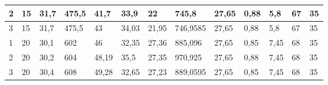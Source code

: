 \begin{table}[H]
{\begin{tabular}{|l|llll|lll|ll|l|ll|}
2             & \multicolumn{1}{l|}{\cellcolor[HTML]{C6E0B4}15}               & \multicolumn{1}{l|}{\cellcolor[HTML]{C6E0B4}31,7}             & \multicolumn{1}{l|}{\cellcolor[HTML]{C6E0B4}475,5}            & 41,7              & \multicolumn{1}{l|}{\cellcolor[HTML]{C6E0B4}33,9}              & \multicolumn{1}{l|}{\cellcolor[HTML]{C6E0B4}22}                & 745,8             & \multicolumn{1}{l|}{\cellcolor[HTML]{C6E0B4}27,65}            & 0,88             & 5,8                       & \multicolumn{1}{l|}{\cellcolor[HTML]{C6E0B4}67}                  & 35               \\ \hline
\rowcolor[HTML]{E2EFDA} 
3             & \multicolumn{1}{l|}{\cellcolor[HTML]{E2EFDA}15}               & \multicolumn{1}{l|}{\cellcolor[HTML]{E2EFDA}31,7}             & \multicolumn{1}{l|}{\cellcolor[HTML]{E2EFDA}475,5}            & 43                & \multicolumn{1}{l|}{\cellcolor[HTML]{E2EFDA}34,03}             & \multicolumn{1}{l|}{\cellcolor[HTML]{E2EFDA}21,95}             & 746,9585          & \multicolumn{1}{l|}{\cellcolor[HTML]{E2EFDA}27,65}            & 0,88             & 5,8                       & \multicolumn{1}{l|}{\cellcolor[HTML]{E2EFDA}67}                  & 35               \\ \hline
\rowcolor[HTML]{C6E0B4} 
1             & \multicolumn{1}{l|}{\cellcolor[HTML]{C6E0B4}20}               & \multicolumn{1}{l|}{\cellcolor[HTML]{C6E0B4}30,1}             & \multicolumn{1}{l|}{\cellcolor[HTML]{C6E0B4}602}              & 46                & \multicolumn{1}{l|}{\cellcolor[HTML]{C6E0B4}32,35}             & \multicolumn{1}{l|}{\cellcolor[HTML]{C6E0B4}27,36}             & 885,096           & \multicolumn{1}{l|}{\cellcolor[HTML]{C6E0B4}27,65}            & 0,85             & 7,45                      & \multicolumn{1}{l|}{\cellcolor[HTML]{C6E0B4}68}                  & 35               \\ \hline
\rowcolor[HTML]{E2EFDA} 
2             & \multicolumn{1}{l|}{\cellcolor[HTML]{E2EFDA}20}               & \multicolumn{1}{l|}{\cellcolor[HTML]{E2EFDA}30,2}             & \multicolumn{1}{l|}{\cellcolor[HTML]{E2EFDA}604}              & 48,19             & \multicolumn{1}{l|}{\cellcolor[HTML]{E2EFDA}35,5}              & \multicolumn{1}{l|}{\cellcolor[HTML]{E2EFDA}27,35}             & 970,925           & \multicolumn{1}{l|}{\cellcolor[HTML]{E2EFDA}27,65}            & 0,88             & 7,45                      & \multicolumn{1}{l|}{\cellcolor[HTML]{E2EFDA}68}                  & 35               \\ \hline
\rowcolor[HTML]{C6E0B4} 
3             & \multicolumn{1}{l|}{\cellcolor[HTML]{C6E0B4}20}               & \multicolumn{1}{l|}{\cellcolor[HTML]{C6E0B4}30,4}             & \multicolumn{1}{l|}{\cellcolor[HTML]{C6E0B4}608}              & 49,28             & \multicolumn{1}{l|}{\cellcolor[HTML]{C6E0B4}32,65}             & \multicolumn{1}{l|}{\cellcolor[HTML]{C6E0B4}27,23}             & 889,0595          & \multicolumn{1}{l|}{\cellcolor[HTML]{C6E0B4}27,65}            & 0,85             & 7,45                      & \multicolumn{1}{l|}{\cellcolor[HTML]{C6E0B4}68}                  & 35               \\ \hline

\end{tabular}}
\end{table}
